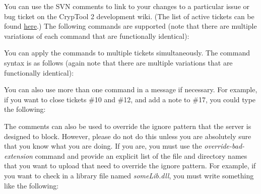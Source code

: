 You can use the SVN comments to link to your changes to a particular issue or bug ticket on the CrypTool 2 development wiki. (The list of active tickets can be found \href{https://www.cryptool.org/trac/CrypTool2/report/1}{here}.) The following commands are supported (note that there are multiple variations of each command that are functionally identical):

\begin{center}
\end{center}
\clearpage

You can apply the commands to multiple tickets simultaneously. The command syntax is as follows (again note that there are multiple variations that are functionally identical):

\begin{center}
\end{center}

You can also use more than one command in a message if necessary. For example, if you want to close tickets \#10 and \#12, and add a note to \#17, you could type the following:

\begin{center}
\end{center}

The comments can also be used to override the ignore pattern that the server is designed to block. However, please do not do this unless you are absolutely sure that you know what you are doing. If you are, you must use the \textit{override-bad-extension} command and provide an explicit list of the file and directory names that you want to upload that need to override the ignore pattern. For example, if you want to check in a library file named \textit{someLib.dll}, you must write something like the following:

